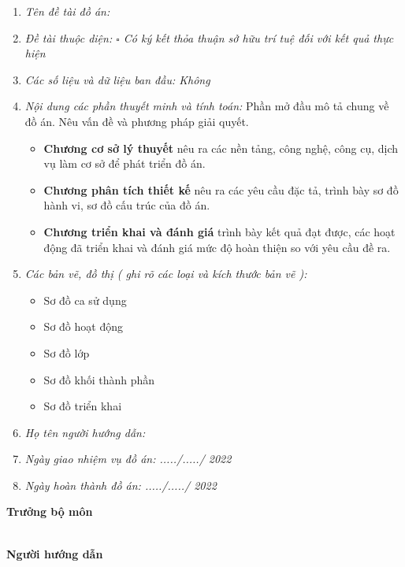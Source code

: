 	\begin{enumerate}[before=\fontsize{13px}{13px}\selectfont]
		\item\emph{Tên đề tài đồ án: \project\dotfill}
		\item\emph{Đề tài thuộc diện: $\square$ Có ký kết thỏa thuận sở hữu trí tuệ đối với kết quả thực hiện}
		\item\emph{Các số liệu và dữ liệu ban đầu: Không\dotfill}
		\item\emph{Nội dung các phần thuyết minh và tính toán:}
		Phần mở đầu mô tả chung về đồ án. Nêu vấn đề và phương pháp giải quyết.
		\begin{itemize}
			\item \textbf{Chương cơ sở lý thuyết} nêu ra các nền tảng, công nghệ, công cụ, dịch vụ làm cơ sở để phát triển đồ án.
			\item \textbf{Chương phân tích thiết kế} nêu ra các yêu cầu đặc tả, trình bày sơ đồ hành vi, sơ đồ cấu trúc của đồ án.
			\item \textbf{Chương triển khai và đánh giá} trình bày kết quả đạt được, các hoạt động đã triển khai và đánh giá mức độ hoàn thiện so với yêu cầu đề ra.
		\end{itemize}
		\item\emph{Các bản vẽ, đồ thị ( ghi rõ các loại và kích thước bản vẽ ):}
		\begin{itemize}
			\item Sơ đồ ca sử dụng
			\item Sơ đồ hoạt động
			\item Sơ đồ lớp
			\item Sơ đồ khối thành phần
			\item Sơ đồ triển khai
		\end{itemize}
		\item\emph{Họ tên người hướng dẫn: \advisor}
		\item\emph{Ngày giao nhiệm vụ đồ án: ...../...../ 2022 \dotfill}
		\item\emph{Ngày hoàn thành đồ án: ...../...../ 2022 \dotfill}
		
	\end{enumerate}
	\raggedright
	\begin{minipage}[t]{.5\textwidth}
		
		\textbf{Trưởng bộ môn} \dotfill
	\end{minipage}\hfill 
	\begin{minipage}[t]{.5\textwidth}
		\center
		\at\\
		\textbf{Người hướng dẫn}
	\end{minipage}\\[2em]
	\pagebreak